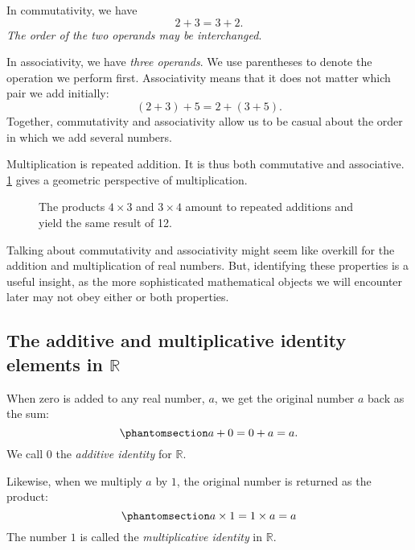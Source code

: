 \documentclass[
  a4paper,
]{article}
\begin{document}
In commutativity, we have \[
2 + 3 = 3 + 2.
\] \emph{The order of the two operands may be interchanged}.

In associativity, we have \emph{three operands}. We use parentheses to
denote the operation we perform first. Associativity means that it does
not matter which pair we add initially: \[
(2 + 3) + 5 = 2 + (3 + 5).
\] Together, commutativity and associativity allow us to be casual about
the order in which we add several numbers.

Multiplication is repeated addition. It is thus both commutative and
associative. \cref{fig:mult} gives a geometric perspective of
multiplication.

\begin{figure}
\centering

\caption{The products \(4\times3\) and \(3\times4\) amount to repeated
additions and yield the same result of 12.}\label{fig:mult}
\end{figure}

Talking about commutativity and associativity might seem like overkill
for the addition and multiplication of real numbers. But, identifying
these properties is a useful insight, as the more sophisticated
mathematical objects we will encounter later may not obey either or both
properties.

\subsection{\texorpdfstring{The additive and multiplicative identity
elements in
\(\mathbb{R}\)}{The additive and multiplicative identity elements in \textbackslash mathbb\{R\}}}\label{the-additive-and-multiplicative-identity-elements-in-mathbbr}

When zero is added to any real number, \(a\), we get the original number
\(a\) back as the sum:
\begin{equation}\phantomsection\label{eq:addident}{
a + 0 = 0 + a = a.
}\end{equation} We call \(0\) the \emph{additive identity} for
\(\mathbb{R}\).

Likewise, when we multiply \(a\) by \(1\), the original number is
returned as the product:
\begin{equation}\phantomsection\label{eq:multident}{
a \times 1 = 1 \times a = a
}\end{equation} The number \(1\) is called the \emph{multiplicative
identity} in \(\mathbb{R}\).
\end{document}

